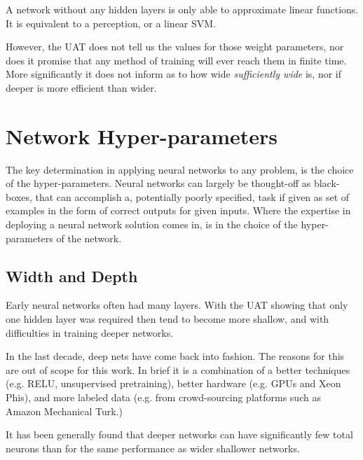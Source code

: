 \documentclass[12pt,parskip]{komatufte}
\begin{document}
A network without any hidden layers is only able to approximate linear functions.
It is equivalent to a perception, or a linear SVM. 


However, the UAT does not tell us the values for those weight parameters,
nor does it promise that any method of training will ever reach them in finite time.
More significantly it does not inform as to how wide \emph{sufficiently wide} is,
nor if deeper is more efficient than wider.


\section{Network Hyper-parameters}

The key determination in applying neural networks to any problem,
is the choice of the hyper-parameters.
Neural networks can largely be thought-off as black-boxes,
that can accomplish a, potentially poorly specified, task if given as set of examples in the form of correct outputs for given inputs.
Where the expertise in deploying a neural network solution comes in, is in the choice of the hyper-parameters of the network.

\subsection{Width and Depth}

Early neural networks often had many layers.
With the UAT showing that only one hidden layer was required then tend to become more shallow, and
with difficulties in training deeper networks.

In the last decade, deep nets have come back into fashion.
The reasons for this are out of scope for this work.
In brief it is a combination of a better techniques (e.g. RELU, unsupervised pretraining),
better hardware (e.g. GPUs and Xeon Phis), and more labeled data (e.g. from crowd-sourcing platforms such as Amazon Mechanical Turk.)

It has been generally found that deeper networks can have significantly few total neurons than for the same performance as wider shallower networks.
\end{document}
